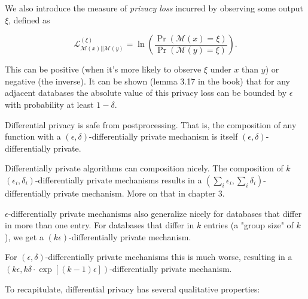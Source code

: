 \documentclass[a4paper]{article}
\begin{document}
We also introduce the measure of \textit{privacy loss} incurred by observing some output $\xi$, defined as

$$\mathcal{L}_{\mathcal{M}(x)||\mathcal{M}(y)}^{(\xi)} = \ln \left( \frac{\Pr(\mathcal{M}(x) = \xi)}{\Pr(\mathcal{M}(y) = \xi)} \right).$$

This can be positive (when it's more likely to observe $\xi$ under $x$ than $y$) or negative (the inverse). It can be shown (lemma 3.17 in the book) that for any adjacent databases the absolute value of this privacy loss can be bounded by $\epsilon$ with probability at least $1-\delta$.

\bigskip

Differential privacy is safe from postprocessing. That is, the composition of any function with a $(\epsilon,\delta)$-differentially private mechanism is itself $(\epsilon,\delta)$-differentially private.

Differentially private algorithms can composition nicely. The composition of $k$ $(\epsilon_i, \delta_i)$-differentially private mechanisms results in a $(\sum_i \epsilon_i, \sum_i \delta_i)$-differentially private mechanism. More on that in chapter 3.

$\epsilon$-differentially private mechanisms also generalize nicely for databases that differ in more than one entry. For databases that differ in $k$ entries (a "group size" of $k$), we get a $(k\epsilon)$-differentially private mechanism.

For $(\epsilon, \delta)$-differentially private mechanisms this is much worse, resulting in a $(k\epsilon, k\delta\cdot\exp[(k-1)\epsilon])$-differentially private mechanism. 

\bigskip

To recapitulate, differential privacy has several qualitative properties:
\end{document}
